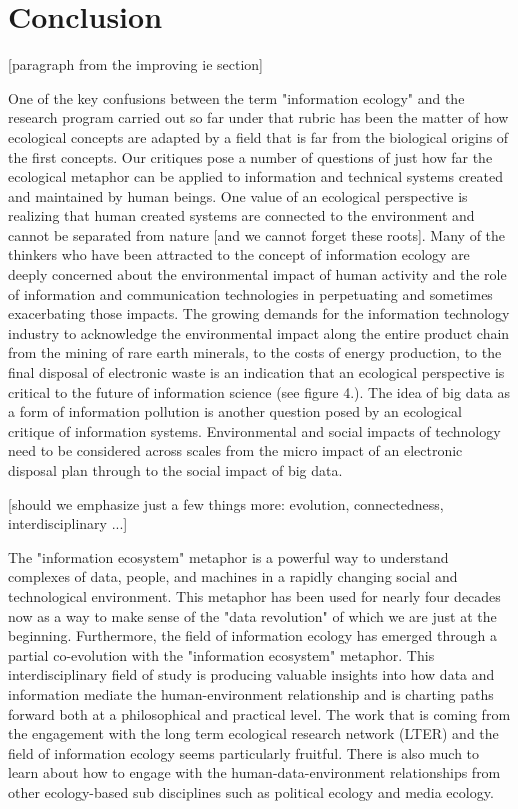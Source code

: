 \section{Conclusion}

[paragraph from the improving ie section]

One of the key confusions between the term "information ecology" and the research program carried out so far under that rubric has been the matter of how ecological concepts are adapted by a field that is far from the biological origins of the first concepts. Our critiques pose a number of questions of just how far the ecological metaphor can be applied to information and technical systems created and maintained by human beings. One value of an ecological perspective is realizing that human created systems are connected to the environment and cannot be separated from nature [and we cannot forget these roots]. Many of the thinkers who have been attracted to the concept of information ecology are deeply concerned about the environmental impact of human activity and the role of information and communication technologies in perpetuating and sometimes exacerbating those impacts. The growing demands for the information technology industry to acknowledge the environmental impact along the entire product chain from the mining of rare earth minerals, to the costs of energy production, to the final disposal of electronic waste is an indication that an ecological perspective is critical to the future of information science (see figure 4.). The idea of big data as a form of information pollution is another question posed by an ecological critique of information systems. Environmental and social impacts of technology need to be considered across scales from the micro impact of an electronic disposal plan through to the social impact of big data.

[should we emphasize just a few things more: evolution, connectedness, interdisciplinary ...]

The "information ecosystem" metaphor is a powerful way to understand complexes of data, people, and machines in a rapidly changing social and technological environment. This metaphor has been used for nearly four decades now as a way to make sense of the "data revolution" of which we are just at the beginning. Furthermore, the field of information ecology has emerged through a partial co-evolution with the "information ecosystem" metaphor. This interdisciplinary field of study is producing valuable insights into how data and information mediate the human-environment relationship and is charting paths forward both at a philosophical and practical level. The work that is coming from the engagement with the long term ecological research network (LTER) and the field of information ecology seems particularly fruitful. There is also much to learn about how to engage with the human-data-environment relationships from other ecology-based sub disciplines such as political ecology and media ecology. 

